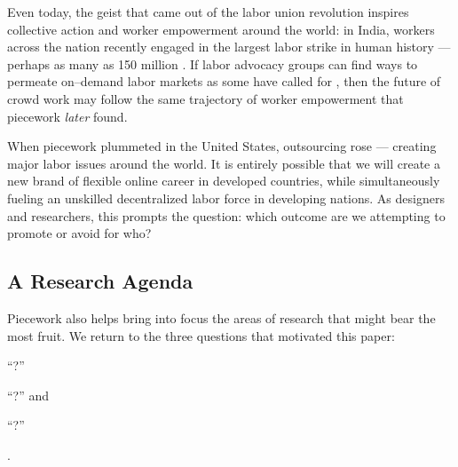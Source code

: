 \documentclass[trackingWork]{subfiles}
\begin{document}
Even today, the geist that came out of the labor union revolution
inspires collective action and worker empowerment around the world:
in India, workers across the nation recently engaged in
the largest labor strike in human history
--- perhaps as many as 150 million
\cite{indiaStrikeRealNews}.
If labor advocacy groups can find ways to permeate on--demand labor markets as some have called for
\cite{futureUnions},
then the future of crowd work may follow
the same trajectory of worker empowerment that piecework \textit{later} found.


When piecework plummeted in the United States, outsourcing rose --- creating major labor issues around the world.
It is entirely possible that we will create a new brand of flexible online career in developed countries, while simultaneously fueling an unskilled decentralized labor force in developing nations.
As designers and researchers, this prompts the question: which outcome are we attempting to promote or avoid for who?




\subsection{A Research Agenda}\label{sec:whatShouldBeTheFuture}
Piecework also helps bring into focus the
areas of research that might bear the most fruit.
We return to the three questions that motivated this paper:
\begin{inlinelist}
  \item ``?''
  \item ``?''
        and
  \item ``?''
\end{inlinelist}.
\end{document}
